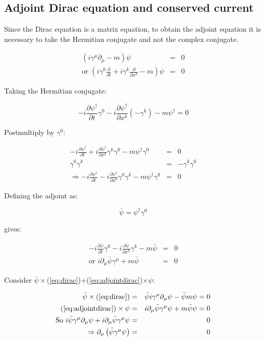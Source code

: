 \subsection{Adjoint Dirac equation and conserved current}

Since the Dirac equation is a matrix equation, to obtain the adjoint equation it is necessary to take the Hermitian conjugate and not the complex conjugate.

\begin{eqnarray}
  \left(i\gamma^{\mu}\partial_{\mu} -m \right)\psi & = & 0 \label{eq:dirac} \\
  \textrm{or } \left( i\gamma^0\frac{\partial}{\partial t} + i\gamma^k\frac{\partial}{\partial x^k} - m \right)\psi & = & 0 \nonumber
\end{eqnarray}

Taking the Hermitian conjugate:

\[
  -i\frac{\partial \psi^{\dagger}}{\partial t}\gamma^0 - i\frac{\partial \psi^{\dagger}}{\partial x^k}\left(-\gamma^k\right) - m\psi^{\dagger} = 0
\]

Postmultiply by $\gamma^0$:

\begin{eqnarray*}
  -i\frac{\partial \psi^{\dagger}}{\partial t} + i\frac{\partial \psi^{\dagger}}{\partial x^k}\gamma^k\gamma^0 - m\psi^{\dagger}\gamma^0 & = & 0 \\
  \gamma^0\gamma^k & = & -\gamma^k\gamma^0 \\
  \Rightarrow -i\frac{\partial \psi^{\dagger}}{\partial t} - i\frac{\partial \psi^{\dagger}}{\partial x^k}\gamma^0\gamma^k - m\psi^{\dagger}\gamma^0 & = & 0
\end{eqnarray*}

Defining the adjoint as:

\[
  \bar{\psi} = \psi^{\dagger}\gamma^0
\]

gives: \nopagebreak

\begin{eqnarray}
  -i \frac{\partial \bar{\psi}}{\partial t}\gamma^0 - i \frac{\partial \bar{\psi}}{\partial x^k}\gamma^k -m\bar{\psi} & = & 0 \nonumber \\
  \textrm{or } i\partial_{\mu}\bar{\psi}\gamma^{\mu} + m\bar{\psi} & = & 0 \label{eq:adjointdirac}
\end{eqnarray}
  
Consider $\bar{\psi}\times$(\ref{eq:dirac})$+$(\ref{eq:adjointdirac})$\times\psi$:

\begin{eqnarray*}
  \bar{\psi}\times(\ref{eq:dirac}) & = & \bar{\psi}i\gamma^{\mu}\partial_{\mu}\psi - \bar{\psi}m\psi = 0 \\
  (\ref{eq:adjointdirac})\times\psi & = & i\partial_{\mu}\bar{\psi}\gamma^{\mu}\psi + m\bar{\psi}\psi = 0 \\
  \textrm{So } i\bar{\psi}\gamma^{\mu}\partial_{\mu}\psi + i\partial_{\mu}\bar{\psi}\gamma^{\mu}\psi & = & 0 \\
  \Rightarrow \partial_{\mu} \left(\bar{\psi}\gamma^{\mu}\psi\right) & = & 0
\end{eqnarray*}

